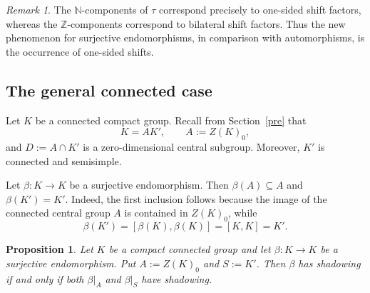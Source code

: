 \documentclass[12pt]{amsart}
\newtheorem{proposition}[theorem]{Proposition}
\theoremstyle{definition}
\numberwithin{equation}{section}
\theoremstyle{remark}
\newtheorem{remark}[theorem]{Remark}
\begin{document}
\begin{remark}\label{rem:semisimple-shifts}
The $\mathbb N$-components of $\tau$ correspond precisely to
one-sided shift factors, whereas the $\mathbb Z$-components correspond
to bilateral shift factors. Thus the new phenomenon for surjective
endomorphisms, in comparison with automorphisms, is the occurrence of
one-sided shifts.
\end{remark}

\subsection{The general connected case}

Let $K$ be a connected compact group. Recall from Section~\ref{pre} that
\[
K=AK',
\qquad
A:=Z(K)_0,
\]
and $D:=A\cap K'$ is a zero-dimensional central subgroup. Moreover,
$K'$ is connected and semisimple.

Let $\beta:K\to K$ be a surjective endomorphism. Then
$\beta(A)\subseteq A$ and $\beta(K')=K'$. Indeed, the first inclusion
follows because the image of the connected central group $A$ is
contained in $Z(K)_0$, while
\[
\beta(K')
=
[\beta(K),\beta(K)]
=
[K,K]
=
K'.
\]

\begin{proposition}\label{prop:central-semisimple-reduction}
Let $K$ be a compact connected group and let
$\beta:K\to K$ be a surjective endomorphism. Put
$A:=Z(K)_0$ and $S:=K'$. Then $\beta$ has shadowing if and only if
both $\beta|_A$ and $\beta|_S$ have shadowing.
\end{proposition}
\end{document}
